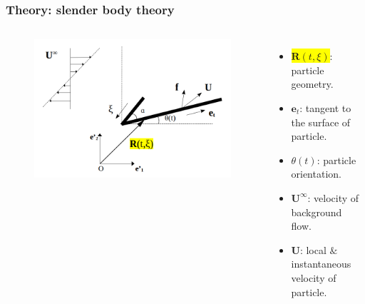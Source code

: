 \documentclass{beamer}
\newcommand{\bi}{\begin{itemize}}
\newcommand{\ei}{\end{itemize}}
\begin{document}
\begin{frame}
	\frametitle{Theory: slender body theory}
	\begin{overlayarea}{\textwidth}{\textheight}
		\vspace{-0.8cm}
		\begin{columns}
			\begin{figure}[htb]
				\begin{center}
					\includegraphics[width=1\textwidth]{plots/rigid_particle2.png}
				\end{center}
			\end{figure}
			\small \bi 
			\item \colorbox{yellow}{$\mathbf{R}(t,\xi)$}: particle geometry.
			\item $\mathbf{e}_t$: tangent to the surface of particle.
			\item $\theta(t)$: particle orientation.
			\item $\mathbf{U}^\infty$: velocity of background flow.
			\item $\mathbf{U}$: local $\&$ instantaneous velocity of particle.
			\ei
		\end{columns}\vspace{0.5cm}
	\end{overlayarea}
\end{frame}

\end{document}
